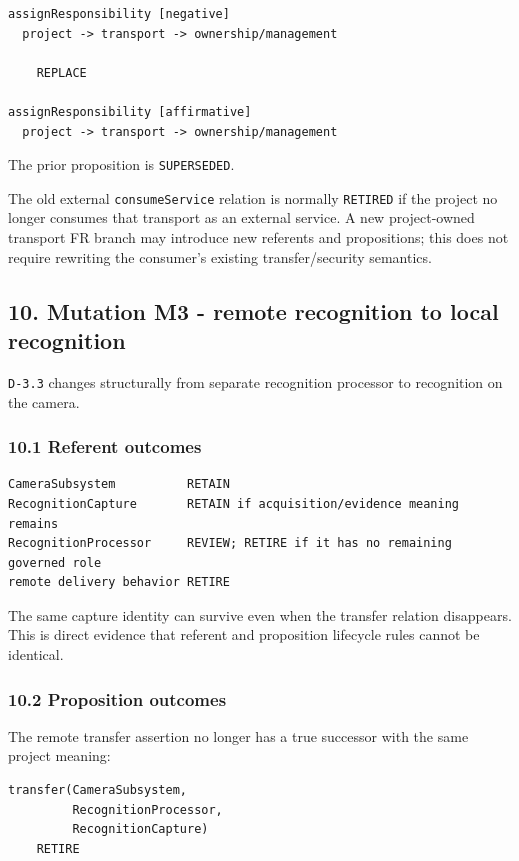 \documentclass[11pt,a4paper]{article}
\begin{document}
\begin{verbatim}
assignResponsibility [negative]
  project -> transport -> ownership/management

    REPLACE

assignResponsibility [affirmative]
  project -> transport -> ownership/management
\end{verbatim}

The prior proposition is \texttt{SUPERSEDED}.

The old external \texttt{consumeService} relation is normally
\texttt{RETIRED} if the project no longer consumes that transport as an
external service. A new project-owned transport FR branch may introduce
new referents and propositions; this does not require rewriting the
consumer's existing transfer/security semantics.

\subsection{10. Mutation M3 - remote recognition to local
recognition}\label{mutation-m3---remote-recognition-to-local-recognition}

\texttt{D-3.3} changes structurally from separate recognition processor
to recognition on the camera.

\subsubsection{10.1 Referent outcomes}\label{referent-outcomes}

\begin{verbatim}
CameraSubsystem          RETAIN
RecognitionCapture       RETAIN if acquisition/evidence meaning remains
RecognitionProcessor     REVIEW; RETIRE if it has no remaining governed role
remote delivery behavior RETIRE
\end{verbatim}

The same capture identity can survive even when the transfer relation
disappears. This is direct evidence that referent and proposition
lifecycle rules cannot be identical.

\subsubsection{10.2 Proposition outcomes}\label{proposition-outcomes}

The remote transfer assertion no longer has a true successor with the
same project meaning:

\begin{verbatim}
transfer(CameraSubsystem,
         RecognitionProcessor,
         RecognitionCapture)
    RETIRE
\end{verbatim}
\end{document}
